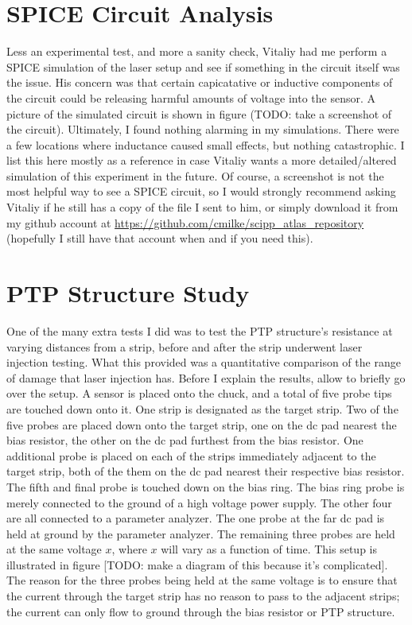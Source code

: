 \documentclass{report}
\begin{document}
        \section{SPICE Circuit Analysis}
            Less an experimental test, and more a sanity check, Vitaliy had me perform a SPICE simulation of the laser setup and see if something in the circuit itself was the issue. His concern was that certain capicatative or inductive components of the circuit could be releasing harmful amounts of voltage into the sensor. A picture of the simulated circuit is shown in figure (TODO: take a screenshot of the circuit). Ultimately, I found nothing alarming in my simulations. There were a few locations where inductance caused small effects, but nothing catastrophic. I list this here mostly as a reference in case Vitaliy wants a more detailed/altered simulation of this experiment in the future. Of course, a screenshot is not the most helpful way to see a SPICE circuit, so I would strongly recommend asking Vitaliy if he still has a copy of the file I sent to him, or simply download it from my github account at \url{https://github.com/cmilke/scipp\_atlas\_repository} (hopefully I still have that account when and if you need this).

        \section{PTP Structure Study} \label{sect:ptp_study}
            One of the many extra tests I did was to test the PTP structure's resistance at varying distances from a strip, before and after the strip underwent laser injection testing. What this provided was a quantitative comparison of the range of damage that laser injection has. Before I explain the results, allow to briefly go over the setup. A sensor is placed onto the chuck, and a total of five probe tips are touched down onto it. One strip is designated as the target strip. Two of the five probes are placed down onto the target strip, one on the dc pad nearest the bias resistor, the other on the dc pad furthest from the bias resistor. One additional probe is placed on each of the strips immediately adjacent to the target strip, both of the them on the dc pad nearest their respective bias resistor. The fifth and final probe is touched down on the bias ring. The bias ring probe is merely connected to the ground of a high voltage power supply. The other four are all connected to a parameter analyzer. The one probe at the far dc pad is held at ground by the parameter analyzer. The remaining three probes are held at the same voltage $x$, where $x$ will vary as a function of time. This setup is illustrated in figure [TODO: make a diagram of this because it's complicated]. The reason for the three probes being held at the same voltage is to ensure that the current through the target strip has no reason to pass to the adjacent strips; the current can only flow to ground through the bias resistor or PTP structure.
\end{document}
